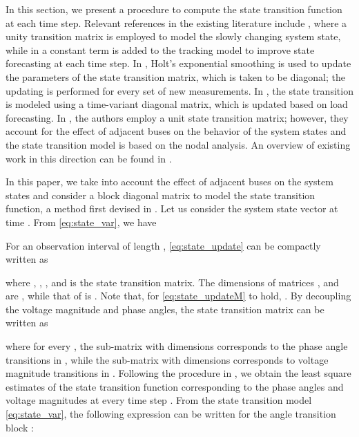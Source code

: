 \documentclass[10pt,journal,twocolumn]{IEEEtran}\IEEEoverridecommandlockouts
\begin{document}
\begin{figure*}[!th]
\normalsize

\hrulefill
\end{figure*}

In this section, we present a procedure to compute the state transition function  at each time step. Relevant references in the existing literature include \cite{Debs1970}, where a unity transition matrix is employed to model the slowly changing system state, while in \cite{Nishiya1982} a constant term is added to the tracking model to improve state forecasting at each time step. In \cite{LeitedaSilva1983}, Holt's exponential smoothing is used to update the parameters of the state transition matrix, which is taken to be diagonal; the updating is performed for every set of new measurements. In \cite{Morvaj1985}, the state transition is modeled using a time-variant diagonal matrix, which is updated based on load forecasting. In \cite{Durgaprasad1998}, the authors employ a unit state transition matrix; however, they account for the effect of adjacent buses on the behavior of the system states and the state transition model is based on the nodal analysis. An overview of existing work in this direction can be found in \cite{BrownDoCouttoFilho2009}.

In this paper, we take into account the effect of adjacent buses on the system states and consider a block diagonal matrix to model the state transition function, a method first devised in \cite{Hassanzadeh2012}. Let us consider the system state vector  at time . From \eqref{eq:state_var}, we have

For an observation interval of length , \eqref{eq:state_update} can be compactly written as

where , , , and  is the state transition matrix. The dimensions of matrices ,  and  are , while that of  is . Note that, for \eqref{eq:state_updateM} to hold, . By decoupling the voltage magnitude and phase angles, the state transition matrix can be written as

where for every , the sub-matrix  with dimensions  corresponds to the phase angle transitions in , while the sub-matrix  with dimensions  corresponds to voltage magnitude transitions in . Following the procedure in \cite[Section III]{Hassanzadeh2012}, we obtain the least square estimates of the state transition function corresponding to the phase angles and voltage magnitudes at every time step . From the state transition model \eqref{eq:state_var}, the following expression can be written for the angle transition block :
\end{document}

